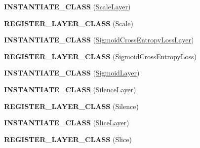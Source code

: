 \begin{DoxyCompactItemize}
\item 
{\bfseries I\+N\+S\+T\+A\+N\+T\+I\+A\+T\+E\+\_\+\+C\+L\+A\+SS} (\hyperlink{classcaffe_1_1ScaleLayer}{Scale\+Layer})\hypertarget{namespacecaffe_aca1ef7ccfa9da3fb302e8f7f4fa60ea7}{}\label{namespacecaffe_aca1ef7ccfa9da3fb302e8f7f4fa60ea7}

\item 
{\bfseries R\+E\+G\+I\+S\+T\+E\+R\+\_\+\+L\+A\+Y\+E\+R\+\_\+\+C\+L\+A\+SS} (Scale)\hypertarget{namespacecaffe_aca3027ca38632f80bfe18fef43d7e716}{}\label{namespacecaffe_aca3027ca38632f80bfe18fef43d7e716}

\item 
{\bfseries I\+N\+S\+T\+A\+N\+T\+I\+A\+T\+E\+\_\+\+C\+L\+A\+SS} (\hyperlink{classcaffe_1_1SigmoidCrossEntropyLossLayer}{Sigmoid\+Cross\+Entropy\+Loss\+Layer})\hypertarget{namespacecaffe_a8cf0d0032a97f7af35c6ab76023160cd}{}\label{namespacecaffe_a8cf0d0032a97f7af35c6ab76023160cd}

\item 
{\bfseries R\+E\+G\+I\+S\+T\+E\+R\+\_\+\+L\+A\+Y\+E\+R\+\_\+\+C\+L\+A\+SS} (Sigmoid\+Cross\+Entropy\+Loss)\hypertarget{namespacecaffe_af9f168cf5361bf0e4f0bd0a40eef8a53}{}\label{namespacecaffe_af9f168cf5361bf0e4f0bd0a40eef8a53}

\item 
{\bfseries I\+N\+S\+T\+A\+N\+T\+I\+A\+T\+E\+\_\+\+C\+L\+A\+SS} (\hyperlink{classcaffe_1_1SigmoidLayer}{Sigmoid\+Layer})\hypertarget{namespacecaffe_ae153024d4b24c9c45f986ae3974cc6b7}{}\label{namespacecaffe_ae153024d4b24c9c45f986ae3974cc6b7}

\item 
{\bfseries I\+N\+S\+T\+A\+N\+T\+I\+A\+T\+E\+\_\+\+C\+L\+A\+SS} (\hyperlink{classcaffe_1_1SilenceLayer}{Silence\+Layer})\hypertarget{namespacecaffe_a064921b478be54bac7eb408bbeb7e305}{}\label{namespacecaffe_a064921b478be54bac7eb408bbeb7e305}

\item 
{\bfseries R\+E\+G\+I\+S\+T\+E\+R\+\_\+\+L\+A\+Y\+E\+R\+\_\+\+C\+L\+A\+SS} (Silence)\hypertarget{namespacecaffe_a278ad9cbbbf2356be969abff9f43da79}{}\label{namespacecaffe_a278ad9cbbbf2356be969abff9f43da79}

\item 
{\bfseries I\+N\+S\+T\+A\+N\+T\+I\+A\+T\+E\+\_\+\+C\+L\+A\+SS} (\hyperlink{classcaffe_1_1SliceLayer}{Slice\+Layer})\hypertarget{namespacecaffe_a0e952eac5677470cac34ff64fd349c8d}{}\label{namespacecaffe_a0e952eac5677470cac34ff64fd349c8d}

\item 
{\bfseries R\+E\+G\+I\+S\+T\+E\+R\+\_\+\+L\+A\+Y\+E\+R\+\_\+\+C\+L\+A\+SS} (Slice)\hypertarget{namespacecaffe_a314589f4c6263a0d173212f097285ef7}{}\label{namespacecaffe_a314589f4c6263a0d173212f097285ef7}


\end{DoxyCompactItemize}
